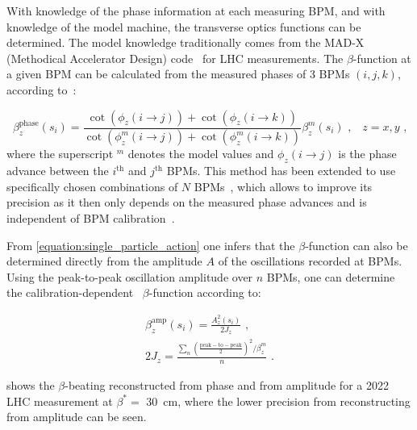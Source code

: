 With knowledge of the phase information at each measuring BPM, and with knowledge of the model machine, the transverse optics functions can be determined.
The model knowledge traditionally comes from the MAD-X (Methodical Accelerator Design) code~\cite{CODE:MADX_guide} for LHC measurements.
The \(\beta\)-function at a given BPM can be calculated from the measured phases of \num{3} BPMs \((i, j, k)\), according to~\cite{PHD:Castro,BOOK:Minty:Measurements_Control_Charged_Particle_Beams}:

\begin{equation}
  \beta_z^{\mathrm{phase}}(s_i) = \frac{\cot \left(\phi_z(i \rightarrow j)\right) + \cot \left(\phi_z(i \rightarrow k)\right)}{\cot \left(\phi^m_z(i \rightarrow j)\right) + \cot \left(\phi^m_z(i \rightarrow k)\right)} \beta^m_z(s_i)  \text{ ,} \quad z = x, y \text{ ,}
  \label{equation:beta_from_phase}
\end{equation}
where the superscript \(^m\) denotes the model values and \(\phi_z(i \rightarrow j)\) is the phase advance between the \(i^{\mathrm{th}}\) and \(j^{\mathrm{th}}\) BPMs.
This method has been extended to use specifically chosen combinations of \(N\) BPMs~\cite{PRAB:Langner:N_BPM_Method,PRAB:Wegscheider:Analytical_N_BPM_Method}, which allows to improve its precision as it then only depends on the measured phase advances and is independent of BPM calibration~\cite{PRAB:Langner:Optics_Measurement_Algorithms_Error_Analysis_Proton_Energy_Frontier}.

From \cref{equation:single_particle_action} one infers that the \(\beta\)-function can also be determined directly from the amplitude \(A\) of the oscillations recorded at BPMs.
Using the peak-to-peak oscillation amplitude over \(n\) BPMs, one can determine the calibration-dependent~\cite{PRAB:GarciaTabares:BPM_Calibration} \(\beta\)-function according to:

\begin{equation}
  \begin{gathered}
    \beta_z^{\mathrm{amp}}(s_i) = \frac{A_z^2(s_i)}{2 J_z} \text{ ,} \\
    2 J_z                       = \frac{\sum_n \left(\frac{\mathrm{peak-to-peak}}{2}\right)^2 / \beta^m_z}{n} \text{ .}
  \end{gathered}
  \label{equation:beta_from_amplitude}
\end{equation}

 shows the \(\beta\)-beating reconstructed from phase and from amplitude for a \num{2022} LHC measurement at \(\beta^{\ast} =\) \qty{30}{\centi\meter}, where the lower precision from reconstructing from amplitude can be seen.

